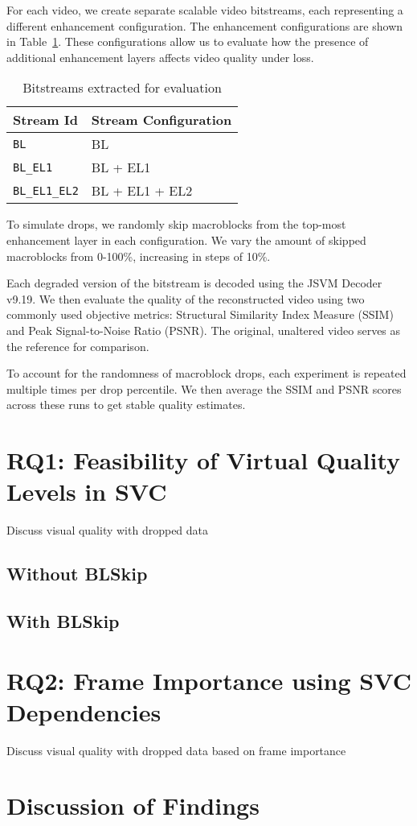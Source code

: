         For each video, we create separate scalable video bitstreams, each
        representing a different enhancement configuration. The enhancement
        configurations are shown in Table~\ref{tab:bitstreams}.  These
        configurations allow us to evaluate how the presence of additional
        enhancement layers affects video quality under loss.


        \begin{table}[H]
            \centering
            \begin{tabular}{ll}
                \toprule
                Stream Id               & Stream Configuration   \\
                \midrule
                \texttt{BL}             & BL                \\
                \texttt{BL\_EL1}        & BL + EL1          \\
                \texttt{BL\_EL1\_EL2}   & BL + EL1 + EL2    \\
                \bottomrule
            \end{tabular}
            \caption{Bitstreams extracted for evaluation}
            \label{tab:bitstreams}
        \end{table}
        

        To simulate drops, we randomly skip
        macroblocks from the top-most enhancement layer in each configuration.
        We vary the amount of skipped macroblocks from 0-100\%, increasing
        in steps of 10\%.

        Each degraded version of the bitstream is decoded using the JSVM Decoder
        v9.19.  We then evaluate the quality of the reconstructed video using
        two commonly used objective metrics: Structural Similarity Index Measure
        (SSIM) and Peak Signal-to-Noise Ratio (PSNR). The original, unaltered
        video serves as the reference for comparison.

        To account for the randomness of macroblock drops, each experiment is
        repeated multiple times per drop percentile.  We then average the SSIM
        and PSNR scores across these runs to get stable quality estimates.

\section{\textbf{RQ1}: Feasibility of Virtual Quality Levels in SVC}
\label{sec:eval_virtual_quality_levels}
    Discuss visual quality with dropped data

    \subsection{Without BLSkip}
    \subsection{With BLSkip}

\section{\textbf{RQ2}: Frame Importance using SVC Dependencies}
    Discuss visual quality with dropped data based on frame importance

\section{Discussion of Findings}